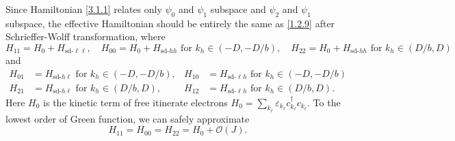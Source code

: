\documentclass[aps,prx,superscriptaddress,onecolumn,preprintnumbers,nofootinbib,longbibliography]{revtex4-1}
\begin{document}
		Since Hamiltonian \eqref{3.1.1} relates only $\psi_0$ and $\psi_1$ subspace and $\psi_2$ and $\psi_1$ subspace, the effective Hamiltonian should be entirely the same as \eqref{1.2.9} after Schrieffer-Wolff transformation, where
		\begin{equation*}
			H_{11}=H_0+H_{\text{sd-}\ell\ell},\quad H_{00}=H_0+H_{\text{sd-}hh}\text{ for }k_h\in(-D,-D/b),\quad H_{22}=H_0+H_{\text{sd-}hh}\text{ for }k_h\in(D/b,D)
		\end{equation*}
		and
		\begin{align*}
			H_{01}&=H_{\text{sd-}h\ell}\text{ for }k_h\in(-D,-D/b), &H_{10}&=H_{\text{sd-}\ell h}\text{ for }k_h\in(-D,-D/b)\\
			H_{21}&=H_{\text{sd-}h\ell}\text{ for }k_h\in(D/b,D), &H_{12}&=H_{\text{sd-}\ell h}\text{ for }k_h\in(D/b,D).
		\end{align*}
		Here $H_0$ is the kinetic term of free itinerate electrons $H_0=\sum_{k_\ell}\varepsilon_{k_\ell} c_{k_\ell}^\dagger c_{k_\ell}$. To the lowest order of Green function, we can safely approximate
		\begin{equation*}
			H_{11}=H_{00}=H_{22}=H_0+\mathcal{O}(J).
		\end{equation*}
\end{document}
